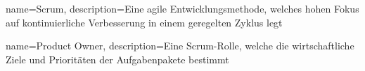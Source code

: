 



{
	name=Scrum,
	description={Eine agile Entwicklungsmethode, welches hohen Fokus auf kontinuierliche Verbesserung in einem geregelten Zyklus legt}
}

{
	name=Product Owner,
	description={Eine Scrum-Rolle, welche die wirtschaftliche Ziele und Prioritäten der Aufgabenpakete bestimmt}
}